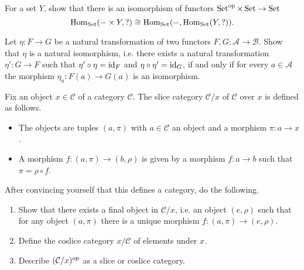 \begin{Exercise}
    For a set $ Y $, show that there is an isomorphism of functors $ \operatorname{Set}^{ \operatorname{op} } \times \operatorname{Set} \to \operatorname{Set} $
    \[
        \operatorname{Hom}_{ \operatorname{Set} } ( - \times Y , ? ) \cong  \operatorname{Hom}_{ \operatorname{Set} } ( - , \operatorname{Hom}_{ \operatorname{Set} } ( Y , ? ) ).
    \]
\end{Exercise}

\begin{Exercise}
    Let $ \eta \colon F \to G $ be a natural transformation of two functors $ F , G \colon \mathcal{ A } \to \mathcal{ B } $.
    Show that $ \eta $ is a natural isomorphism, i.e. there exists a natural transformation $ \eta' \colon G \to F $ such that $ \eta' \circ \eta = \operatorname{id}_F $ and $ \eta \circ \eta' = \operatorname{id}_G $, if and only if for every $ a \in \mathcal{ A } $ the morphism $ \eta_a \colon F ( a ) \to G ( a ) $ is an isomorphism.
\end{Exercise}

\begin{Exercise}
    Fix an object $ x \in \mathcal{ C } $ of a category $ \mathcal{ C } $. 
    The slice category $ \mathcal{ C } / x $ of $ \mathcal{ C } $ over $ x $ is defined as follows.
    \begin{itemize}
        \item 
        The objects are tuples $ ( a , \pi ) $ with $ a  \in \mathcal{ C } $ an object and a morphism $ \pi \colon a \to x $. 
        \item 
        A morphism $ f \colon ( a , \pi ) \to ( b , \rho ) $ is given by a morphism $ f \colon a \to b $ such that $ \pi = \rho \circ f $.
    \end{itemize}

    After convincing yourself that this defines a category, do the following.
    
    \begin{enumerate}[label=(\alph*)]
    
        \item 
        Show that there exists a final object in $ \mathcal{ C } / x $, i.e. an object $ ( e , \rho ) $ such that for any object $ ( a , \pi ) $ there is a unique morphism $ f \colon ( a , \pi ) \to ( e , \rho ) $.
        \item 
        
        Define the coslice category $ x / \mathcal{ C } $ of elements under $ x $.
        
        \item 
        Describe $ ( \mathcal{ C } / x )^{ \operatorname{op} } $ as a slice or coslice category.
        
    \end{enumerate}
\end{Exercise}
